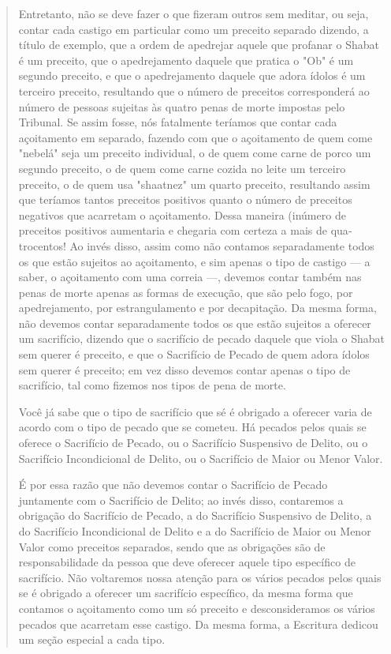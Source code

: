 \begin{quote}
Entretanto, não se deve fazer o que fizeram outros sem meditar, ou seja,
contar cada castigo em particular como um preceito separado dizendo, a
título de exemplo, que a ordem de apedrejar aquele que profanar o Shabat
é um preceito, que o apedrejamento daquele que pratica o "Ob" é um
segun­do preceito, e que o apedrejamento daquele que adora ídolos é um
terceiro preceito, resultando que o número de preceitos corresponderá ao
número de pessoas sujeitas às quatro penas de morte impostas pelo
Tribunal. Se assim fos­se, nós fatalmente teríamos que contar cada
açoitamento em separado, fazendo com que o açoitamento de quem come
"nebelá" seja um preceito individual, o de quem come carne de porco um
segundo preceito, o de quem come carne cozida no leite um terceiro
preceito, o de quem usa "shaatnez" um quarto pre­ceito, resultando assim
que teríamos tantos preceitos positivos quanto o núme­ro de preceitos
negativos que acarretam o açoitamento. Dessa maneira (inú­mero de
preceitos positivos aumentaria e chegaria com certeza a mais de
qua­trocentos! Ao invés disso, assim como não contamos separadamente
todos os que estão sujeitos ao açoitamento, e sim apenas o tipo de
castigo --- a saber, o açoitamento com uma correia ---, devemos contar
também nas penas de morte apenas as formas de execução, que são pelo
fogo, por apedrejamento, por es­trangulamento e por decapitação. Da
mesma forma, não devemos contar sepa­radamente todos os que estão
sujeitos a oferecer um sacrifício, dizendo que o sacrifício de pecado
daquele que viola o Shabat sem querer é preceito, e que o Sacrifício de
Pecado de quem adora ídolos sem querer é preceito; em vez disso devemos
contar apenas o tipo de sacrifício, tal como fizemos nos tipos de pena
de morte.

Você já sabe que o tipo de sacrifício que sé é obrigado a oferecer varia
de acordo com o tipo de pecado que se cometeu. Há pecados pelos quais se
oferece o Sacrifício de Pecado, ou o Sacrifício Suspensivo de Delito, ou
o Sacrifício Incondicional de Delito, ou o Sacrifício de Maior ou Menor
Valor.

É por essa razão que não devemos contar o Sacrifício de Pecado
juntamente com o Sacrifício de Delito; ao invés disso, contaremos a
obrigação do Sacrifí­cio de Pecado, a do Sacrifício Suspensivo de
Delito, a do Sacrifício Incondicio­nal de Delito e a do Sacrifício de
Maior ou Menor Valor como preceitos separa­dos, sendo que as obrigações
são de responsabilidade da pessoa que deve ofe­recer aquele tipo
específico de sacrifício. Não voltaremos nossa atenção para os vários
pecados pelos quais se é obrigado a oferecer um sacrifício específico,
da mesma forma que contamos o açoitamento como um só preceito e
descon­sideramos os vários pecados que acarretam esse castigo. Da mesma
forma, a Escritura dedicou um seção especial a cada tipo.


\end{quote}
